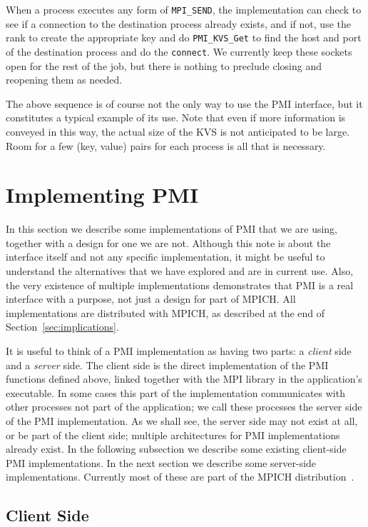 \documentclass[11pt]{article}
\begin{document}
When a process executes any form of {\tt MPI\_SEND}, the
implementation can check to see if a connection to the destination
process already exists, and if not, use the rank to create the
appropriate key and do {\tt PMI\_KVS\_Get} to find the host and port of the
destination process and do the {\tt connect}.  We currently keep these
sockets open for the rest of the job, but there is nothing to preclude
closing and reopening them as needed.

The above sequence is of course not the only way to use the PMI
interface, but it constitutes a typical example of its use.  Note that
even if more information is conveyed in this way, the actual size of the
KVS is not anticipated to be large.  Room for a few (key, value) pairs
for each process is all that is necessary.

\section{Implementing PMI}
\label{sec:implementing}

In this section we describe some implementations of PMI that we are
using, together with a design for one we are not.  Although this note is
about the interface itself and not any specific implementation, it might
be useful to understand the alternatives that we have explored and are
in current use.  Also, the very existence of multiple implementations
demonstrates that PMI is a real interface with a purpose, not just a
design for part of MPICH.  All implementations are distributed with
MPICH, as described at the end of Section~\ref{sec:implications}.

It is useful to think of a PMI implementation as having two parts: a 
{\em client\/} side and a {\em server\/} side.  The client side is the
direct implementation of the PMI functions defined above, linked together
with the MPI library in the application's executable.  In some cases this
part of the implementation communicates with other processes not part of
the application;  we call these processes the server side of the PMI
implementation.  As we shall see, the server side may not exist at all,
or be part of the client side; multiple architectures for PMI
implementations already exist.  In the following subsection we describe some
existing client-side PMI implementations.  In the next section we
describe some server-side implementations.  Currently most of these are
part of the MPICH distribution~\cite{mpich-web-page}.


\subsection{Client Side}
\label{sec:client-side}
\end{document}
